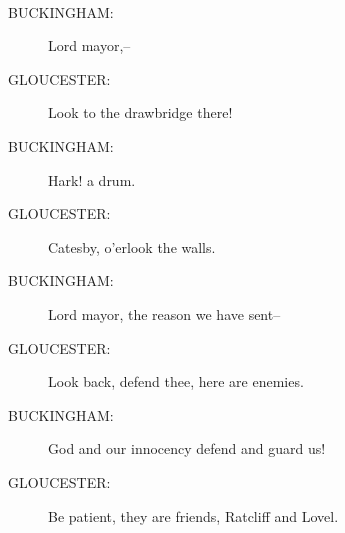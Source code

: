 \documentclass{article}
\begin{document}
\\
\begin{description}
\item[BUCKINGHAM:] 
\hspace{1pt}Lord mayor,--\\
\end{description}
\begin{description}
\item[GLOUCESTER:] 
\hspace{1pt}Look to the drawbridge there!\\
\end{description}
\begin{description}
\item[BUCKINGHAM:] 
\hspace{1pt}Hark! a drum.\\
\end{description}
\begin{description}
\item[GLOUCESTER:] 
\hspace{1pt}Catesby, o'erlook the walls.\\
\end{description}
\begin{description}
\item[BUCKINGHAM:] 
\hspace{1pt}Lord mayor, the reason we have sent--\\
\end{description}
\begin{description}
\item[GLOUCESTER:] 
\hspace{1pt}Look back, defend thee, here are enemies.\\
\end{description}
\begin{description}
\item[BUCKINGHAM:] 
\hspace{1pt}God and our innocency defend and guard us!\\
\end{description}
\begin{description}
\item[GLOUCESTER:] 
\hspace{1pt}Be patient, they are friends, Ratcliff and Lovel.\\
\end{description}
\\
\end{document}
